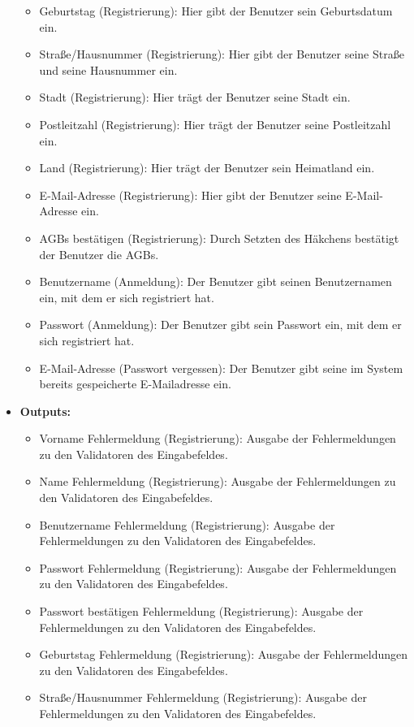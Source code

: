 \begin{itemize}
\begin{itemize}
							\item Geburtstag (Registrierung): Hier gibt der Benutzer sein Geburtsdatum ein.
							\item Straße/Hausnummer (Registrierung): Hier gibt der Benutzer seine Straße und seine Hausnummer ein.
							\item Stadt (Registrierung): Hier trägt der Benutzer seine Stadt ein.
							\item Postleitzahl (Registrierung): Hier trägt der Benutzer seine Postleitzahl ein.
							\item Land (Registrierung): Hier trägt der Benutzer sein Heimatland ein.
							\item E-Mail-Adresse (Registrierung): Hier gibt der Benutzer seine E-Mail-Adresse ein.
							\item AGBs bestätigen (Registrierung): Durch Setzten des Häkchens bestätigt der Benutzer die AGBs. 
							\item Benutzername (Anmeldung): Der Benutzer gibt seinen Benutzernamen ein, mit dem er sich registriert hat.
							\item Passwort (Anmeldung): Der Benutzer gibt sein Passwort ein, mit dem er sich registriert hat.
							\item E-Mail-Adresse (Passwort vergessen): Der Benutzer gibt seine im System bereits gespeicherte E-Mailadresse ein.
						\end{itemize}
					\item \textbf{Outputs:} 
						\begin{itemize}
							\item Vorname Fehlermeldung (Registrierung): Ausgabe der Fehlermeldungen zu den Validatoren des Eingabefeldes.
							\item Name Fehlermeldung (Registrierung): Ausgabe der Fehlermeldungen zu den Validatoren des Eingabefeldes.
							\item Benutzername Fehlermeldung (Registrierung): Ausgabe der Fehlermeldungen zu den Validatoren des Eingabefeldes.
							\item Passwort Fehlermeldung (Registrierung): Ausgabe der Fehlermeldungen zu den Validatoren des Eingabefeldes.
							\item Passwort bestätigen Fehlermeldung (Registrierung): Ausgabe der Fehlermeldungen zu den Validatoren des Eingabefeldes.
							\item Geburtstag Fehlermeldung (Registrierung): Ausgabe der Fehlermeldungen zu den Validatoren des Eingabefeldes.
							\item Straße/Hausnummer Fehlermeldung (Registrierung): Ausgabe der Fehlermeldungen zu den Validatoren des Eingabefeldes.

\end{itemize}
\end{itemize}
